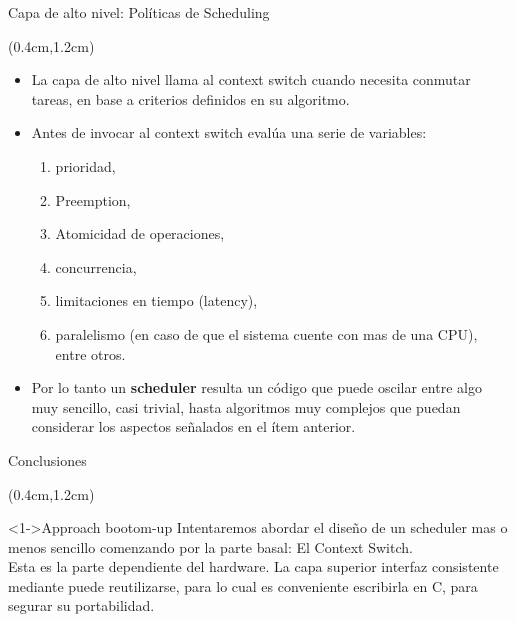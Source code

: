 \begin{frame}{Capa de alto nivel: Políticas de Scheduling}
 \begin{textblock*}{\textwidth}(0.4cm,1.2cm)
  \begin{itemize}[<+(1)->] \justifying  \parskip 0.3cm
   \item La capa de alto nivel llama al context switch cuando necesita conmutar tareas, en base a criterios definidos en su algoritmo.
   \item Antes de invocar al context switch evalúa una serie de variables:
   \begin{enumerate}
    \item prioridad,
    \item Preemption, 
    \item Atomicidad de operaciones, 
    \item concurrencia, 
    \item limitaciones en tiempo (latency), 
    \item paralelismo (en caso de que el sistema cuente con mas de una CPU), entre otros.
   \end{enumerate}
   \item Por lo tanto un \textbf{scheduler} resulta un código que puede oscilar entre algo muy sencillo, casi trivial, hasta algoritmos muy complejos que puedan considerar los aspectos señalados en el ítem anterior.
  \end{itemize} 
 \end{textblock*}
\end{frame}

\begin{frame}{Conclusiones}
 \begin{textblock*}{\textwidth}(0.4cm,1.2cm)
  \begin{block}<1->{Approach bootom-up} \justifying
  Intentaremos abordar el diseño de un scheduler mas o menos sencillo comenzando por la parte basal: El Context Switch.\\
  Esta es la parte dependiente del hardware. La capa superior interfaz consistente mediante puede reutilizarse, para lo cual es conveniente escribirla en C, para segurar su portabilidad.
  \end{block}
 \end{textblock*}
\end{frame}
